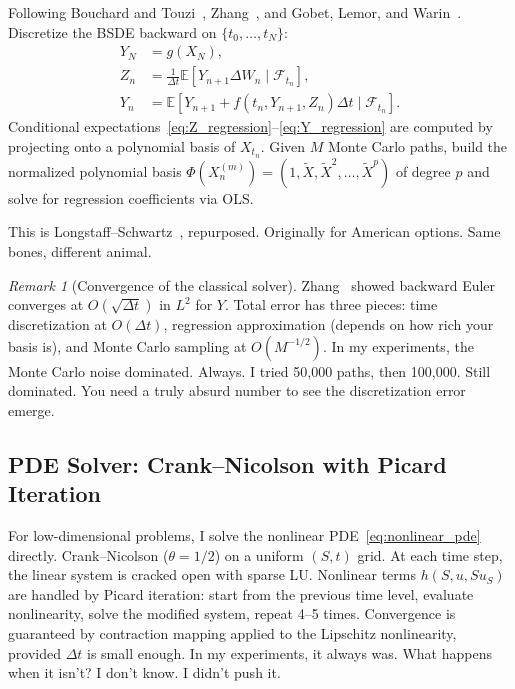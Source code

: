 \documentclass[11pt]{article}
\theoremstyle{definition}
\theoremstyle{remark}
\newtheorem{remark}[theorem]{Remark}
\newcommand{\E}{\mathbb{E}}
\newcommand{\F}{\mathcal{F}}
\begin{document}
Following Bouchard and Touzi~\cite{bouchard2004discrete},
Zhang~\cite{zhang2004numerical}, and Gobet, Lemor, and
Warin~\cite{gobet2005regression}. Discretize the BSDE backward
on $\{t_0, \ldots, t_N\}$:
\begin{align}
  Y_N &= g(X_N), \label{eq:bsde_terminal}\\
  Z_n &= \frac{1}{\Delta t}\E\!\left[Y_{n+1}\Delta W_n \mid \F_{t_n}\right],
    \label{eq:Z_regression}\\
  Y_n &= \E\!\left[Y_{n+1} + f(t_n, Y_{n+1}, Z_n)\Delta t
    \mid \F_{t_n}\right]. \label{eq:Y_regression}
\end{align}
Conditional
expectations~\eqref{eq:Z_regression}--\eqref{eq:Y_regression} are
computed by projecting onto a polynomial basis of $X_{t_n}$.
Given $M$ Monte Carlo paths, build the normalized polynomial basis
$\Phi(X_n^{(m)}) = (1, \tilde{X}, \tilde{X}^2, \ldots, \tilde{X}^p)$
of degree $p$ and solve for regression coefficients via OLS.

This is Longstaff--Schwartz~\cite{longstaff2001valuing}, repurposed.
Originally for American options. Same bones, different animal.

\begin{remark}[Convergence of the classical solver]
Zhang~\cite{zhang2004numerical} showed backward Euler converges at
$O(\sqrt{\Delta t})$ in $L^2$ for $Y$. Total error has three pieces:
time discretization at $O(\Delta t)$, regression approximation (depends
on how rich your basis is), and Monte Carlo sampling at
$O(M^{-1/2})$. In my experiments, the Monte Carlo noise dominated.
Always. I tried 50,000 paths, then 100,000. Still dominated. You
need a truly absurd number to see the discretization error emerge.
\end{remark}

\subsection{PDE Solver: Crank--Nicolson with Picard Iteration}

For low-dimensional problems, I solve the nonlinear
PDE~\eqref{eq:nonlinear_pde} directly. Crank--Nicolson
($\theta = 1/2$) on a uniform $(S, t)$ grid. At each time step,
the linear system is cracked open with sparse LU. Nonlinear terms
$h(S, u, Su_S)$ are handled by Picard iteration: start from the
previous time level, evaluate nonlinearity, solve the modified
system, repeat 4--5 times. Convergence is guaranteed by contraction
mapping applied to the Lipschitz nonlinearity, provided $\Delta t$ is
small enough. In my experiments, it always was.
What happens when it isn't? I don't know. I didn't push it.
\end{document}
